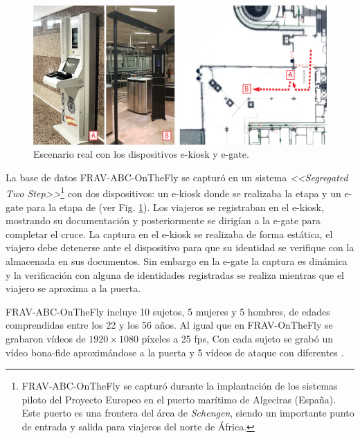 \begin{figure}[h!]
    \centering
    \includegraphics[width=1\textwidth]{ch-sistemasABC/images/ch-onthefly/realDevices.png}
    \caption{Escenario real con los dispositivos \gls{e-kiosk} y \gls{e-gate}.}
    \label{fig:realdevices}
\end{figure}

La base de datos \Gls{FRAV-ABC-OnTheFly} se capturó en un sistema  \textit{<<Segregated Two Step>>}\footnote{\Gls{FRAV-ABC-OnTheFly} se capturó durante la implantación de los sistemas  piloto del Proyecto Europeo  \cite{ABC4EUOnline} en el puerto marítimo de Algeciras (España). Este puerto es una frontera del área de \textit{\Gls{Schengen}}, siendo un importante punto de entrada y salida para viajeros del norte de África.} con dos dispositivos: un \gls{e-kiosk} donde se realizaba la etapa  y un \gls{e-gate} para la etapa de  (ver Fig. \ref{fig:realdevices}). Los viajeros se registraban en el \gls{e-kiosk}, mostrando su documentación y posteriormente se dirigían a la \gls{e-gate} para completar el cruce. La captura en el \gls{e-kiosk} se realizaba de forma estática, el viajero debe detenerse ante el dispositivo para que su identidad se verifique con la almacenada en sus documentos. Sin embargo en la \gls{e-gate} la captura es dinámica y la verificación con alguna de identidades registradas se realiza mientras que el viajero se aproxima a la puerta.

\Gls{FRAV-ABC-OnTheFly} incluye 10 sujetos, 5 mujeres y 5 hombres, de edades comprendidas entre los 22 y los 56 años. Al igual que en \Gls{FRAV-OnTheFly} se grabaron vídeos de $1920\times1080$ píxeles a 25 fps, Con cada sujeto se grabó un vídeo \gls{bona-fide} aproximándose a la puerta y 5 vídeos de ataque con diferentes .

